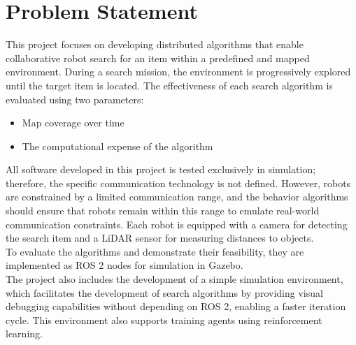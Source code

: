 \section{Problem Statement}
\label{sec:problem-statement}

This project focuses on developing distributed algorithms that enable collaborative robot search for an item within a predefined and mapped environment. During a search mission, the environment is progressively explored until the target item is located. The effectiveness of each search algorithm is evaluated using two parameters:

\begin{itemize}
    \item Map coverage over time
    \item The computational expense of the algorithm
\end{itemize}

All software developed in this project is tested exclusively in simulation; therefore, the specific communication technology is not defined. However, robots are constrained by a limited communication range, and the behavior algorithms should ensure that robots remain within this range to emulate real-world communication constraints. Each robot is equipped with a camera for detecting the search item and a LiDAR sensor for measuring distances to objects. \\

To evaluate the algorithms and demonstrate their feasibility, they are implemented as ROS 2 nodes for simulation in Gazebo. \\

The project also includes the development of a simple simulation environment, which facilitates the development of search algorithms by providing visual debugging capabilities without depending on ROS 2, enabling a faster iteration cycle. This environment also supports training agents using reinforcement learning.
